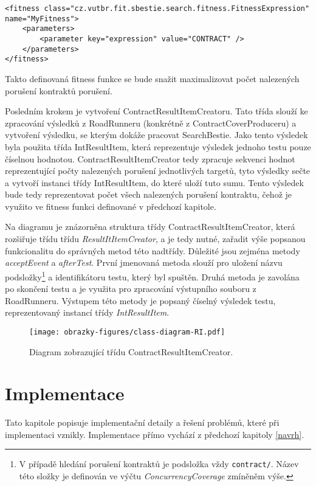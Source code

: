 \begin{lstlisting}
<fitness class="cz.vutbr.fit.sbestie.search.fitness.FitnessExpression" name="MyFitness">
	<parameters>
		<parameter key="expression" value="CONTRACT" />
	</parameters>
</fitness>
\end{lstlisting}

Takto definovaná fitness funkce se bude snažit maximalizovat počet nalezených porušení kontraktů porušení.

Posledním krokem je vytvoření ContractResultItemCreatoru. Tato třída slouží ke zpracování výsledků z RoadRunneru (konkrétně z ContractCoverProduceru) a vytvoření výsledku, se kterým dokáže pracovat SearchBestie. Jako tento výsledek byla použita třída IntResultItem, která reprezentuje výsledek jednoho testu pouze číselnou hodnotou. ContractResultItemCreator tedy zpracuje sekvenci hodnot reprezentující počty nalezených porušení jednotlivých targetů, tyto výsledky sečte a vytvoří instanci třídy IntResultItem, do které uloží tuto sumu. Tento výsledek bude tedy reprezentovat počet všech nalezených porušení kontraktu, čehož je využito ve fitness funkci definované v předchozí kapitole.

Na diagramu je znázorněna struktura třídy ContractResultItemCreator, která rozšiřuje třídu třídu \textit{ResultItItemCreator}, a je tedy nutné, zařadit výše popsanou funkcionalitu do správných metod této nadtřídy. Důležité jsou zejména metody \textit{acceptEvent} a \textit{afterTest}. První jmenovaná metoda slouží pro uložení názvu podsložky\footnote{V případě hledání porušení kontraktů je podsložka vždy \texttt{contract/}. Název této složky je definován ve výčtu \textit{ConcurrencyCoverage} zmíněněm výše.} a identifikátoru testu, který byl spuštěn. Druhá metoda je zavolána po skončení testu a je využita pro zpracování výstupního souboru z RoadRunneru. Výstupem této metody je popsaný číselný výsledek testu, reprezentovaný instancí třídy \textit{IntResultItem}.

\begin{figure}[!htbp]
    \texttt{[image: obrazky-figures/class-diagram-RI.pdf]}
    \caption{Diagram zobrazující třídu ContractResultItemCreator.}
    \label{class-cover}
\end{figure}

\chapter{Implementace}

Tato kapitole popisuje implementační detaily a řešení problémů, které při implementaci vznikly. Implementace přímo vychází z předchozí kapitoly \ref{navrh}.

